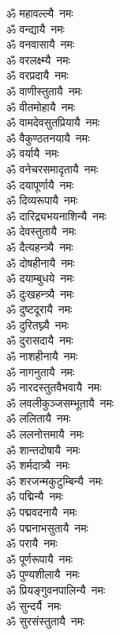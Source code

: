 \begin{flushleft}
\begin{multicols}{2}
ॐ महावल्ल्यै~नमः\\
ॐ वन्द्यायै~नमः\\
ॐ वनवासायै~नमः\\
ॐ वरलक्ष्म्यै~नमः\\
ॐ वरप्रदायै~नमः\\
ॐ वाणीस्तुतायै~नमः\\
ॐ वीतमोहायै~नमः\\
ॐ वामदेवसुतप्रियायै~नमः\\
ॐ वैकुण्ठतनयायै~नमः\\
ॐ वर्यायै~नमः\hfill{}\\
ॐ वनेचरसमादृतायै~नमः\\
ॐ दयापूर्णायै~नमः\\
ॐ दिव्यरूपायै~नमः\\
ॐ दारिद्र्यभयनाशिन्यै~नमः\\
ॐ देवस्तुतायै~नमः\\
ॐ दैत्यहन्त्र्यै~नमः\\
ॐ दोषहीनायै~नमः\\
ॐ दयाम्बुधये~नमः\\
ॐ दुःखहन्त्र्यै~नमः\\
ॐ दुष्टदूरायै~नमः\hfill{}\\
ॐ दुरितघ्न्यै~नमः\\
ॐ दुरासदायै~नमः\\
ॐ नाशहीनायै~नमः\\
ॐ नागनुतायै~नमः\\
ॐ नारदस्तुतवैभवायै~नमः\\
ॐ लवलीकुञ्जसम्भूतायै~नमः\\
ॐ ललितायै~नमः\\
ॐ ललनोत्तमायै~नमः\\
ॐ शान्तदोषायै~नमः\\
ॐ शर्मदात्र्यै~नमः\hfill{}\\
ॐ शरजन्मकुटुम्बिन्यै~नमः\\
ॐ पद्मिन्यै~नमः\\
ॐ पद्मवदनायै~नमः\\
ॐ पद्मनाभसुतायै~नमः \\
ॐ परायै~नमः\\
ॐ पूर्णरूपायै~नमः\\
ॐ पुण्यशीलायै~नमः\\
ॐ प्रियङ्गुवनपालिन्यै~नमः\\
ॐ सुन्दर्यै~नमः\\
ॐ सुरसंस्तुतायै~नमः\hfill{}\\

\end{multicols}
\end{flushleft}
